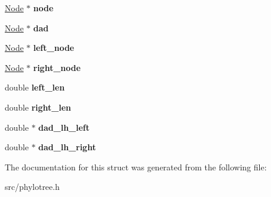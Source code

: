 \begin{DoxyCompactItemize}
\item 
\hypertarget{structPruningInfo_a99285f9c2373612afe9695dbeae390d4}{
\hyperlink{classNode}{Node} $\ast$ {\bfseries node}}
\label{structPruningInfo_a99285f9c2373612afe9695dbeae390d4}

\item 
\hypertarget{structPruningInfo_adabe089d7a0af10ef05ae3a7c89efc7f}{
\hyperlink{classNode}{Node} $\ast$ {\bfseries dad}}
\label{structPruningInfo_adabe089d7a0af10ef05ae3a7c89efc7f}

\item 
\hypertarget{structPruningInfo_ad7fccd2c088de6e5dcf602d121bbf4b9}{
\hyperlink{classNode}{Node} $\ast$ {\bfseries left\_\-node}}
\label{structPruningInfo_ad7fccd2c088de6e5dcf602d121bbf4b9}

\item 
\hypertarget{structPruningInfo_a26cd0b6db39ff90d2d9eeae91072b357}{
\hyperlink{classNode}{Node} $\ast$ {\bfseries right\_\-node}}
\label{structPruningInfo_a26cd0b6db39ff90d2d9eeae91072b357}

\item 
\hypertarget{structPruningInfo_aa38d094382df0bf9332b7df30ca1dbaa}{
double {\bfseries left\_\-len}}
\label{structPruningInfo_aa38d094382df0bf9332b7df30ca1dbaa}

\item 
\hypertarget{structPruningInfo_ad707df4f786d3b69b28c37cd66861d8d}{
double {\bfseries right\_\-len}}
\label{structPruningInfo_ad707df4f786d3b69b28c37cd66861d8d}

\item 
\hypertarget{structPruningInfo_a07a4ea31a495780db8adc374ab8b4ac5}{
double $\ast$ {\bfseries dad\_\-lh\_\-left}}
\label{structPruningInfo_a07a4ea31a495780db8adc374ab8b4ac5}

\item 
\hypertarget{structPruningInfo_a49135d608f2f25ae7492080e07f04903}{
double $\ast$ {\bfseries dad\_\-lh\_\-right}}
\label{structPruningInfo_a49135d608f2f25ae7492080e07f04903}

\end{DoxyCompactItemize}


The documentation for this struct was generated from the following file:\begin{DoxyCompactItemize}
\item 
src/phylotree.h\end{DoxyCompactItemize}
